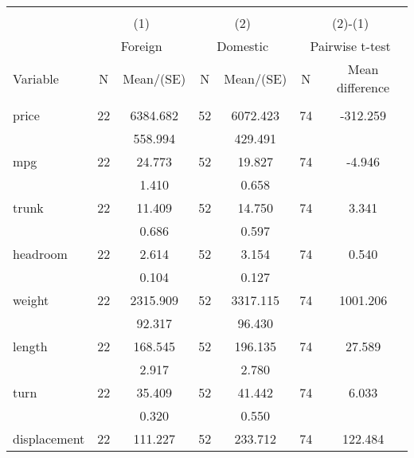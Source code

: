 
\begin{tabular}{@{\extracolsep{5pt}}lcccccc}
\\[-1.8ex]\hline \hline \\[-1.8ex]
 & \multicolumn{2}{c}{(1)}  & \multicolumn{2}{c}{(2)}  & \multicolumn{2}{c}{(2)-(1)} \\
 & \multicolumn{2}{c}{Foreign}  & \multicolumn{2}{c}{Domestic}  & \multicolumn{2}{c}{Pairwise t-test}  \\
Variable & N & Mean/(SE) & N & Mean/(SE) & N & Mean difference \\ \hline \\[-1.8ex] 
price   & 22    &  6384.682    & 52    &  6072.423    & 74    &  -312.259   \\
 &   &   558.994  &   &   429.491  &   &   \\
mpg   & 22    &    24.773    & 52    &    19.827    & 74    &    -4.946   \\
 &   &     1.410  &   &     0.658  &   &   \\
trunk   & 22    &    11.409    & 52    &    14.750    & 74    &     3.341   \\
 &   &     0.686  &   &     0.597  &   &   \\
headroom   & 22    &     2.614    & 52    &     3.154    & 74    &     0.540   \\
 &   &     0.104  &   &     0.127  &   &   \\
weight   & 22    &  2315.909    & 52    &  3317.115    & 74    &  1001.206   \\
 &   &    92.317  &   &    96.430  &   &   \\
length   & 22    &   168.545    & 52    &   196.135    & 74    &    27.589   \\
 &   &     2.917  &   &     2.780  &   &   \\
turn   & 22    &    35.409    & 52    &    41.442    & 74    &     6.033   \\
 &   &     0.320  &   &     0.550  &   &   \\
displacement   & 22    &   111.227    & 52    &   233.712    & 74    &   122.484   \\

\end{tabular}

